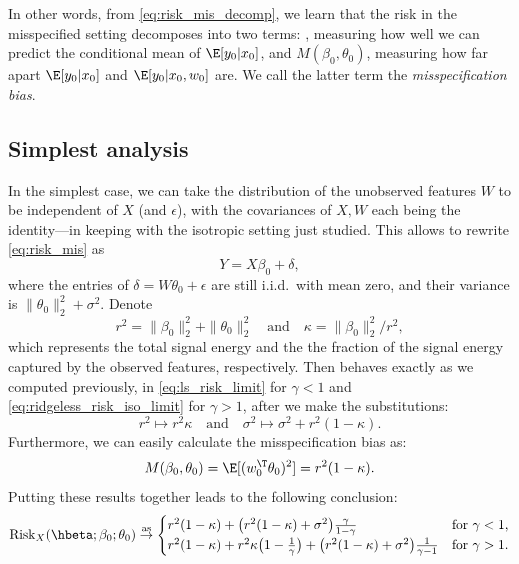 \documentclass{article}
\begin{document}
In other words, from \eqref{eq:risk_mis_decomp}, we learn that the risk in the
misspecified setting decomposes into two terms: , measuring how well we can predict the conditional mean
of $\E[y_0|x_0]$, and $M(\beta_0, \theta_0)$, measuring how far apart
$\E[y_0|x_0]$ and $\E[y_0|x_0,w_0]$ are. We call the latter term the
\emph{misspecification bias}.

\subsection{Simplest analysis}

In the simplest case, we can take the distribution of the unobserved features
$W$ to be independent of $X$ (and $\epsilon$), with the covariances of $X,W$
each being the identity---in keeping with the isotropic setting just
studied. This allows to rewrite \eqref{eq:risk_mis} as 
\[
Y = X\beta_0 + \delta,
\]
where the entries of $\delta = W\theta_0 + \epsilon$ are still i.i.d.\ with mean
zero, and their variance is $\|\theta_0\|_2^2 + \sigma^2$. Denote 
\[
r^2 = \|\beta_0\|_2^2 + \|\theta_0\|_2^2 \quad \text{and} \quad  
\kappa = \|\beta_0\|_2^2 / r^2,
\]
which represents the total signal energy and the the fraction of the signal
energy captured by the observed features, respectively. Then  behaves exactly as we computed previously, in
\eqref{eq:ls_risk_limit} for $\gamma<1$ and \eqref{eq:ridgeless_risk_iso_limit}
for $\gamma>1$, after we make the substitutions:     
\[
r^2 \mapsto r^2 \kappa \quad \text{and} \quad
\sigma^2 \mapsto \sigma^2 + r^2 (1-\kappa).
\]
Furthermore, we can easily calculate the misspecification bias as: 
\[
M(\beta_0, \theta_0) = \E[(w_0^\T \theta_0)^2] = r^2 (1-\kappa). 
\]
Putting these results together leads to the following conclusion:
\begin{equation}
\label{eq:ridgeless_risk_iso_mis_limit}
\Risk_X(\hbeta; \beta_0; \theta_0) \asto 
\begin{cases}
r^2 (1-\kappa) + \big(r^2(1-\kappa) + \sigma^2\big) 
\frac{\gamma}{1-\gamma} & \text{for $\gamma < 1$}, \\
r^2 (1-\kappa) + r^2 \kappa \big(1-\frac{1}{\gamma}\big) 
+ \big(r^2 (1-\kappa) + \sigma^2\big) \frac{1}{\gamma-1} &   
\text{for $\gamma > 1$}.
\end{cases}
\end{equation}
\end{document}
